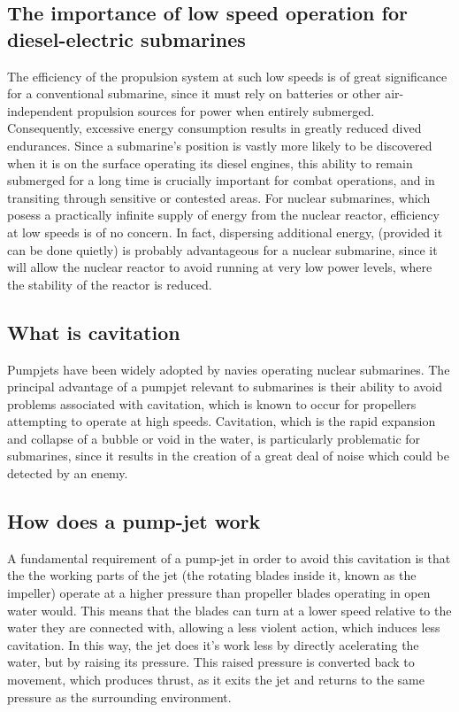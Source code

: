 \documentclass{article}\usepackage[]{graphicx}\usepackage[]{color}
\begin{document}
\subsection{The importance of low speed operation for diesel-electric submarines}
The efficiency of the propulsion system at such low speeds is of great significance for a conventional submarine, since it must rely on batteries or other air-independent propulsion sources for power when entirely submerged.  Consequently, excessive energy consumption results in greatly reduced dived endurances.  Since a submarine's position is vastly more likely to be discovered when it is on the surface operating its diesel engines, this ability to remain submerged for a long time is crucially important for combat operations, and in transiting through sensitive or contested areas.  For nuclear submarines, which posess a practically infinite supply of energy from the nuclear reactor, efficiency at low speeds is of no concern.  In fact, dispersing additional energy, (provided it can be done quietly) is probably advantageous for a nuclear submarine, since it will allow the nuclear reactor to avoid running at very low power levels, where the stability of the reactor is reduced.

\subsection{What is cavitation}
Pumpjets have been widely adopted by navies operating nuclear submarines.  The principal advantage of a pumpjet relevant to submarines is their ability to avoid problems associated with cavitation, which is known to occur for propellers attempting to operate at high speeds.  Cavitation, which is the rapid expansion and collapse of a bubble or void in the water, is particularly problematic for submarines, since it results in the creation of a great deal of noise which could be detected by an enemy.

\subsection{How does a pump-jet work}
A fundamental requirement of a pump-jet in order to avoid this cavitation is that the the working parts of the jet (the rotating blades inside it, known as the impeller) operate at a higher pressure than propeller blades operating in open water would.  This means that the blades can turn at a lower speed relative to the water they are connected with, allowing a less violent action, which induces less cavitation.  In this way, the jet does it's work less by directly acelerating the water, but by raising its pressure.  This raised pressure is converted back to movement, which produces thrust, as it exits the jet and returns to the same pressure as the surrounding environment.
\end{document}

